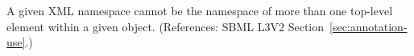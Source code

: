A given XML namespace cannot be the namespace of more than one top-level
element within a given \Annotation object.  (References: SBML L3V2
Section~\ref{sec:annotation-use}.)

